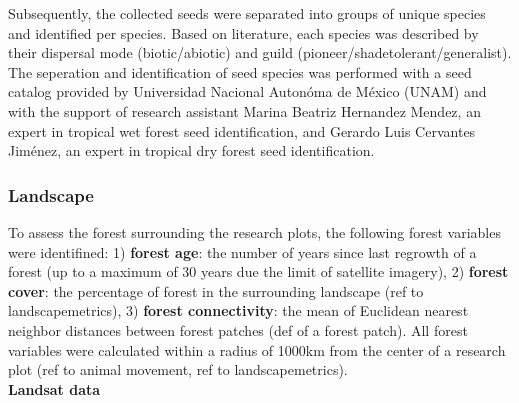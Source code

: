 Subsequently, the collected seeds were separated into groups of unique species and identified per species. Based on literature, each species was described by their dispersal mode (biotic/abiotic) and guild (pioneer/shadetolerant/generalist). The seperation and identification of seed species was performed with a seed catalog provided by Universidad Nacional Autonóma de México (UNAM) and with the support of research assistant Marina Beatriz Hernandez Mendez, an expert in tropical wet forest seed identification, and Gerardo Luis Cervantes Jiménez, an expert in tropical dry forest seed identification. 


\subsubsection{Landscape}

To  assess the forest surrounding the research plots, the following forest variables were identifined: 1) \textbf{forest age}: the number of years since last regrowth of a forest (up to a maximum of 30 years due the limit of satellite imagery), 2) \textbf{forest cover}: the percentage of forest in the surrounding landscape (ref to landscapemetrics), 3) \textbf{forest connectivity}: the mean of Euclidean nearest neighbor distances between forest patches (def of a forest patch). All forest variables were calculated within a radius of 1000km from the center of a research plot (ref to animal movement, ref to landscapemetrics).  \\

\textbf{Landsat data}\\

